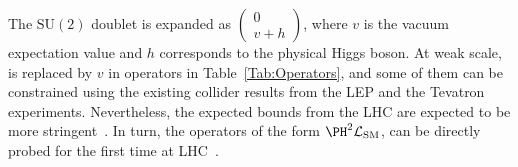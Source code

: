 \documentclass[a4paper,11pt]{article}
\begin{document}

The $\textrm{SU}(2)$ doublet \PH is expanded as $\begin{pmatrix} 0 \\ v+h \end{pmatrix}$, where $v$ is the vacuum expectation value  and $h$ corresponds to the physical Higgs boson.
At weak scale,  \PH is replaced by $v$ in operators in Table~\ref{Tab:Operators}, and some of them can be constrained using the existing collider results from  the LEP and the Tevatron experiments.
Nevertheless, the expected bounds from the LHC are expected to be more stringent~\cite{Ellis:2014jta,Grojean:2018dqj}.
In turn, the operators of the form ${\PH}^2\mathcal{L}_{\text{SM}}$, can be directly probed for the first time at LHC~\cite{Gupta:2014rxa}. 
\end{document}

